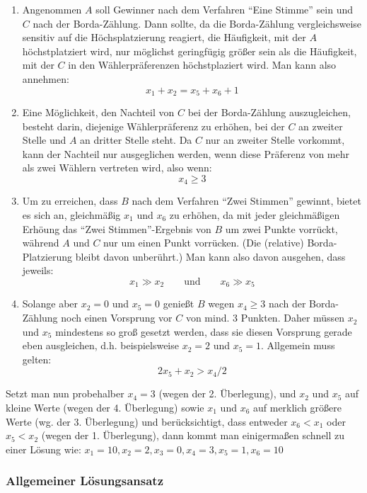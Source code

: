 \documentclass[10pt, a4paper, german]{article}
\numberwithin {equation}{section}
\begin{document}
\begin{enumerate}
\item Angenommen $A$ soll Gewinner nach dem Verfahren ``Eine Stimme''
  sein und $C$ nach der Borda-Zählung. Dann sollte, da die
  Borda-Zählung vergleichsweise sensitiv auf die Höchsplatzierung
  reagiert, die Häufigkeit, mit der $A$ höchstplatziert wird, nur
  möglichst geringfügig größer sein als die Häufigkeit, mit der $C$
  in den Wählerpräferenzen höchstplaziert wird. Man kann also annehmen:
  \[ x_1 + x_2 = x_5 + x_6 + 1\]

\item Eine Möglichkeit, den Nachteil von $C$ bei der Borda-Zählung
  auszugleichen, besteht darin, diejenige Wählerpräferenz zu erhöhen,
  bei der $C$ an zweiter Stelle und $A$ an dritter Stelle steht. Da
  $C$ nur an zweiter Stelle vorkommt, kann der Nachteil nur
  ausgeglichen werden, wenn diese Präferenz von mehr als zwei Wählern
  vertreten wird, also wenn:
  \[ x_4 \geq 3 \]

\item Um zu erreichen, dass $B$ nach dem Verfahren ``Zwei Stimmen''
  gewinnt, bietet es sich an, gleichmäßig $x_1$ und $x_6$ zu erhöhen,
  da mit jeder gleichmäßigen Erhöung das ``Zwei Stimmen''-Ergebnis
  von $B$ um zwei Punkte vorrückt, während $A$ und $C$ nur um einen
  Punkt vorrücken. (Die (relative) Borda-Platzierung bleibt davon
  unberührt.) Man kann also davon ausgehen, dass jeweils:
  \[ x_1 \gg x_2 \qquad \mbox{und} \qquad x_6 \gg x_5 \]

\item Solange aber $x_2 = 0$ und $x_5 = 0$ genießt $B$ wegen $x_4 \geq 3$
  nach der Borda-Zählung noch einen Vorsprung vor $C$ von mind. 3
  Punkten. Daher müssen $x_2$ und $x_5$ mindestens so groß gesetzt
  werden, dass sie diesen Vorsprung gerade eben ausgleichen,
  d.h. beispielsweise $x_2=2$ und $x_5=1$. Allgemein muss gelten:
  \[ 2x_5 + x_2 > x_4/2 \] 
\end{enumerate}

\vspace{0.2cm}
Setzt man nun probehalber $x_4 = 3$ (wegen der 2. Überlegung), und
$x_2$ und $x_5$ auf kleine Werte (wegen der 4. Überlegung) sowie $x_1$
und $x_6$ auf merklich größere Werte (wg. der 3. Überlegung) und
berücksichtigt, dass entweder $x_6 < x_1$ oder $x_5 < x_2$ (wegen der
1. Überlegung), dann kommt man einigermaßen schnell zu einer Lösung wie:
$x_1=10, x_2=2, x_3=0, x_4=3, x_5=1, x_6=10$


\subsubsection{Allgemeiner Lösungsansatz}
\end{document}
